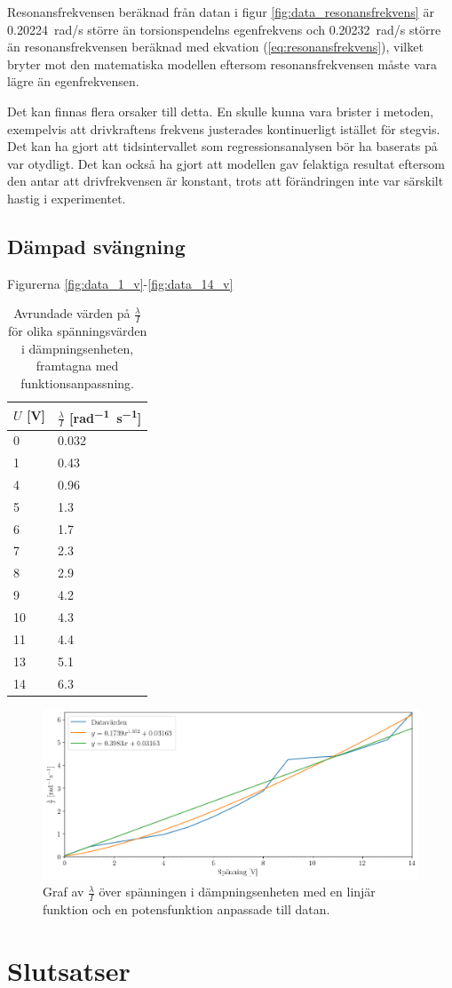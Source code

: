 \documentclass[12pt, a4paper]{article}
\begin{document}
Resonansfrekvensen beräknad från datan i figur \ref{fig:data_resonansfrekvens} är \SI{0.20224}{rad/s} större än torsionspendelns egenfrekvens och \SI{0.20232}{rad/s} större än resonansfrekvensen beräknad med ekvation (\ref{eq:resonansfrekvens}), vilket bryter mot den matematiska modellen eftersom resonansfrekvensen måste vara lägre än egenfrekvensen. 

Det kan finnas flera orsaker till detta. En skulle kunna vara brister i metoden, exempelvis att drivkraftens frekvens justerades kontinuerligt istället för stegvis. Det kan ha gjort att tidsintervallet som regressionsanalysen bör ha baserats på var otydligt. Det kan också ha gjort att modellen gav felaktiga resultat eftersom den antar att drivfrekvensen är konstant, trots att förändringen inte var särskilt hastig i experimentet.

\subsection{Dämpad svängning}
Figurerna \ref{fig:data_1_v}-\ref{fig:data_14_v}

\begin{table}[hp]
	\centering
	\begin{tabular}{ |l|l| }
		\hline 
		\rule{0ex}{1.5em}
		$U$ [V] & $\frac{\lambda}{I}$ [\si{rad^{-1}s^{-1}}]
		\\[0.5em]
		\hline
		0 & 0.032 \\
		\hline
		1 & 0.43 \\
		\hline
		4 & 0.96 \\
		\hline
		5 & 1.3 \\
		\hline
		6 & 1.7 \\
		\hline
		7 & 2.3 \\
		\hline
		8 & 2.9 \\
		\hline
		9 & 4.2 \\
		\hline
		10 & 4.3 \\
		\hline
		11 & 4.4 \\
		\hline
		13 & 5.1 \\
		\hline
		14 & 6.3 \\
		\hline
	\end{tabular}
	\caption{Avrundade värden på $\frac{\lambda}{I}$ för olika spänningsvärden i dämpningsenheten, framtagna med funktionsanpassning.}
\end{table}

\begin{figure}[hp]
	\includegraphics[width=\textwidth]{graf_voltage_damping}
	\caption{Graf av $\frac{\lambda}{I}$ över spänningen i dämpningsenheten med en linjär funktion och en potensfunktion anpassade till datan.}
	\label{fig:dämpning_över_spänning}
\end{figure}

\section{Slutsatser}
\end{document}
